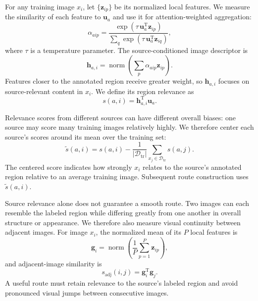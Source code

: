 \documentclass[a4paper,fleqn]{cas-dc}
\begin{document}
For any training image $x_i$, let $\{\mathbf{z}_{ip}\}$ be its normalized local features. We measure the similarity of each feature to $\mathbf{u}_a$ and use it for attention-weighted aggregation:
\begin{equation}
\alpha_{aip}=
\frac{\exp\left(\tau\,\mathbf{u}_a^{\mathrm T}\mathbf{z}_{ip}\right)}
{\sum_q\exp\left(\tau\,\mathbf{u}_a^{\mathrm T}\mathbf{z}_{iq}\right)},
\end{equation}
where $\tau$ is a temperature parameter. The source-conditioned image descriptor is
\begin{equation}
\mathbf{h}_{a,i}=
\operatorname{norm}\left(\sum_p\alpha_{aip}\mathbf{z}_{ip}\right).
\end{equation}
Features closer to the annotated region receive greater weight, so $\mathbf{h}_{a,i}$ focuses on source-relevant content in $x_i$. We define its region relevance as
\begin{equation}
s(a,i)=\mathbf{h}_{a,i}^{\mathrm T}\mathbf{u}_a.
\end{equation}

Relevance scores from different sources can have different overall biases: one source may score many training images relatively highly. We therefore center each source's scores around its mean over the training set:
\begin{equation}
\widetilde{s}(a,i)=s(a,i)-
\frac{1}{|\mathcal{D}_{\mathrm{tr}}|}
\sum_{x_j\in\mathcal{D}_{\mathrm{tr}}}s(a,j).
\end{equation}
The centered score indicates how strongly $x_i$ relates to the source's annotated region relative to an average training image. Subsequent route construction uses $\widetilde{s}(a,i)$.

Source relevance alone does not guarantee a smooth route. Two images can each resemble the labeled region while differing greatly from one another in overall structure or appearance. We therefore also measure visual continuity between adjacent images. For image $x_i$, the normalized mean of its $P$ local features is
\begin{equation}
\mathbf{g}_i=
\operatorname{norm}\left(
\frac{1}{P}\sum_{p=1}^{P}\mathbf{z}_{ip}
\right),
\end{equation}
and adjacent-image similarity is
\begin{equation}
s_{\mathrm{adj}}(i,j)=\mathbf{g}_i^{\mathrm T}\mathbf{g}_j.
\end{equation}
A useful route must retain relevance to the source's labeled region and avoid pronounced visual jumps between consecutive images.
\end{document}
